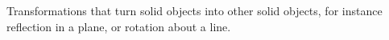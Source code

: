 Transformations that turn solid objects into other solid objects,
for instance reflection in a plane, or rotation about a line.
